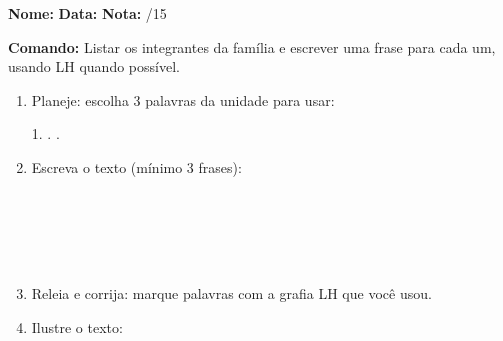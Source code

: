 \begin{exercicio}

\noindent\textbf{Nome:} \underline{\hspace{3.2cm}} \quad \textbf{Data:} \underline{\hspace{1.6cm}} \quad \textbf{Nota:} \underline{\hspace{0.9cm}}/15


\noindent\textbf{Comando:} Listar os integrantes da família e escrever uma frase para cada um, usando LH quando possível.


\begin{enumerate}

  \item Planeje: escolha 3 palavras da unidade para usar:
  \begin{center}
  1. \underline{\hspace{3cm}} . \underline{\hspace{3cm}} . \underline{\hspace{3cm}}
  \end{center}

  \item Escreva o texto (mínimo 3 frases):
  \begin{center}
  \underline{\hspace{12cm}}\\\underline{\hspace{12cm}}\\\underline{\hspace{12cm}}\\\underline{\hspace{12cm}}\\\underline{\hspace{12cm}}
  \end{center}

  \item Releia e corrija: marque palavras com a grafia LH que você usou.

  \item Ilustre o texto:
  \begin{center}
  \end{center}

\end{enumerate}

\end{exercicio}

